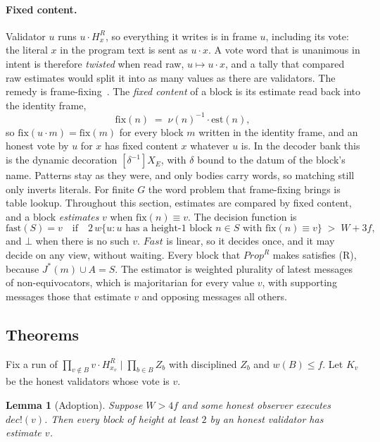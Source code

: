 \documentclass[11pt]{article}
\newtheorem{lemma}[theorem]{Lemma}
\theoremstyle{definition}
\theoremstyle{remark}
\newcommand{\snd}[2]{#1!(#2)}
\newcommand{\act}[2]{#1\cdot #2}
\newcommand{\scong}{\equiv}
\newcommand{\Jst}{J^{*}}
\newcommand{\est}{\mathrm{est}}
\newcommand{\fr}[2]{[#1]#2}
\begin{document}
\paragraph{Fixed content.}
Validator $u$ runs $\act{u}{H^R_x}$, so everything it writes is in frame $u$,
including its vote: the literal $x$ in the program text is sent as
$\act{u}{x}$. A vote word that is unanimous in intent is therefore
\emph{twisted} when read raw, $u\mapsto\act{u}{x}$, and a tally that compared
raw estimates would split it into as many values as there are validators. The
remedy is frame-fixing~\cite[\S7]{oriented}. The \emph{fixed content} of a
block is its estimate read back into the identity frame,
\[
\mathrm{fix}(n)\;=\;\act{\nu(n)^{-1}}{\est(n)},
\]
so $\mathrm{fix}(\act{u}{m})=\mathrm{fix}(m)$ for every block $m$ written in
the identity frame, and an honest vote by $u$ for $x$ has fixed content $x$
whatever $u$ is. In the decoder bank this is the dynamic decoration
$\fr{\delta^{-1}}{X_E}$, with $\delta$ bound to the datum of the block's name.
Patterns stay as they were, and only bodies carry words, so matching still
only inverts literals. For finite $G$ the word problem that frame-fixing
brings is table lookup. Throughout this section, estimates are compared by
fixed content, and a block \emph{estimates} $v$ when
$\mathrm{fix}(n)\scong v$. The decision function is
\[
\mathrm{fast}(S)=v
\quad\text{if}\quad
2\,w\{u : u \text{ has a height-1 block } n\in S \text{ with }
\mathrm{fix}(n)\scong v\}
\;>\;W+3f,
\]
and $\bot$ when there is no such $v$. $\mathit{Fast}$ is linear, so it decides
once, and it may decide on any view, without waiting. Every block that
$\mathit{Prop}^R$ makes satisfies (R), because $\Jst(m)\cup A=S$. The estimator
is weighted plurality of latest messages of non-equivocators, which is
majoritarian for every value $v$, with supporting messages those that estimate
$v$ and opposing messages all others.

\subsection{Theorems}

Fix a run of $\prod_{v\notin B}\act{v}{H^R_{x_v}}\mid\prod_{b\in B}Z_b$ with
disciplined $Z_b$ and $w(B)\le f$. Let $K_v$ be the honest validators whose
vote is $v$.

\begin{lemma}[Adoption]\label{lem:adopt}
Suppose $W>4f$ and some honest observer executes
$\snd{\mathit{dec}}{v}$. Then every block of height at least $2$ by an honest
validator has estimate $v$.
\end{lemma}
\end{document}
